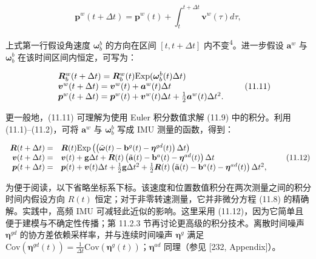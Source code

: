 \begin{equation}
\pmb {p} ^ {w} (t + \Delta t) = \pmb {p} ^ {w} (t) + \int_ {t} ^ {t + \Delta t} \pmb {v} ^ {w} (\tau) d \tau,\tag{11.10}
\end{equation}

上式第一行假设角速度 $\boldsymbol\omega_b^b$ 的方向在区间 $[t,t+\Delta t]$ 内不变\textsuperscript{4}。进一步假设 $\mathbf a^w$ 与 $\boldsymbol\omega_b^b$ 在该时间区间内恒定，可写为：

\begin{equation}
\begin{array}{r l} & {\pmb {R} _ {b} ^ {w} (t + \Delta t) = \pmb {R} _ {b} ^ {w} (t) \mathrm{Exp} (\pmb {\omega} _ {b} ^ {b} (t) \Delta t)} \\ & {\pmb {v} ^ {w} (t + \Delta t) = \pmb {v} ^ {w} (t) + \pmb {a} ^ {w} (t) \Delta t} \\ & {\pmb {p} ^ {w} (t + \Delta t) = \pmb {p} ^ {w} (t) + \pmb {v} ^ {w} (t) \Delta t + \frac {1}{2} \pmb {a} ^ {w} (t) \Delta t ^ {2}.} \end{array}\tag{11.11}
\end{equation}

更一般地，(11.11) 可理解为使用 Euler 积分数值求解 (11.9) 中的积分。利用 (11.1)--(11.2)，可将 $\mathbf a^w$ 与 $\boldsymbol\omega_b^b$ 写成 IMU 测量的函数，得到：

\begin{equation}
\begin{array}{r l} \boldsymbol {R} (t + \Delta t) = & \boldsymbol {R} (t) \mathrm{Exp} \left(\left(\tilde {\boldsymbol {\omega}} (t) - \mathbf {b} ^ {g} (t) - \boldsymbol {\eta} ^ {g d} (t)\right) \Delta t\right) \\ \boldsymbol {v} (t + \Delta t) = & \boldsymbol {v} (t) + \mathbf {g} \Delta t + \boldsymbol {R} (t) \left(\tilde {\mathbf {a}} (t) - \mathbf {b} ^ {a} (t) - \boldsymbol {\eta} ^ {a d} (t)\right) \Delta t \\ \boldsymbol {p} (t + \Delta t) = & \boldsymbol {p} (t) + \boldsymbol {v} (t) \Delta t + \frac {1}{2} \mathbf {g} \Delta t ^ {2} + \frac {1}{2} \boldsymbol {R} (t) \left(\tilde {\mathbf {a}} (t) - \mathbf {b} ^ {a} (t) - \boldsymbol {\eta} ^ {a d} (t)\right) \Delta t ^ {2}, \end{array}\tag{11.12}
\end{equation}

为便于阅读，以下省略坐标系下标。该速度和位置数值积分在两次测量之间的积分时间内假设方向 $R(t)$ 恒定；对于非零转速测量，它并非微分方程 (11.8) 的精确解。实践中，高频 IMU 可减轻此近似的影响。这里采用 (11.12)，因为它简单且便于建模与不确定性传播；第 11.2.3 节再讨论更高级的积分技术。离散时间噪声 $\boldsymbol\eta^{gd}$ 的协方差依赖采样率，并与连续时间噪声 $\boldsymbol\eta^g$ 满足 $\mathrm{Cov}(\boldsymbol\eta^{gd}(t))=\frac{1}{\Delta t}\mathrm{Cov}(\boldsymbol\eta^g(t))$；$\boldsymbol\eta^{ad}$ 同理（参见 [232, Appendix]）。

